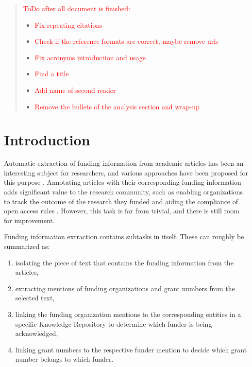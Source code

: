 \documentclass{report}
\theoremstyle{definition}
\theoremstyle{remark}
\begin{document}
\newpage
\begin{abstract}
    \textcolor{red}{ToDo after all document is finished:}
    \begin{itemize}
        \item \textcolor{red}{Fix repeating citations}
        \item \textcolor{red}{Check if the reference formats are correct, maybe remove urls}
        \item \textcolor{red}{Fix acronyms introduction and usage}
        \item \textcolor{red}{Find a title}
        \item \textcolor{red}{Add name of second reader}
        \item \textcolor{red}{Remove the bullets of the analysis section and wrap-up}
        
    \end{itemize}
\end{abstract}
\newpage
\chapter{Introduction}
\label{sec:intro}
Automatic extraction of funding information from academic articles has been an interesting subject for researchers, and various approaches have been proposed for this purpose \cite{ElsPaper,AckExtract,GrantExtractor}. Annotating articles with their corresponding funding information adds significant value to the research community, such as enabling organizations to track the outcome of the research they funded \cite{ElsPaper} and aiding the compliance of open access rules \cite{GrantExtractor}. However, this task is far from trivial, and there is still room for improvement.

Funding information extraction contains subtasks in itself. These can roughly be summarized as:
\renewcommand{\labelenumi}{(\roman{enumi})}
\begin{enumerate}
     \vspace{-0.3cm}\item isolating the piece of text that contains the funding information from the articles,
     \vspace{-0.6cm}\item extracting mentions of funding organizations and grant numbers from the selected text,
     \vspace{-0.3cm}\item linking the funding organization mentions to the corresponding entities in a specific Knowledge Repository to determine which funder is being acknowledged,
     \vspace{-0.3cm}\item linking grant numbers to the respective funder mention to decide which grant number belongs to which funder. 
\end{enumerate}
\end{document}
